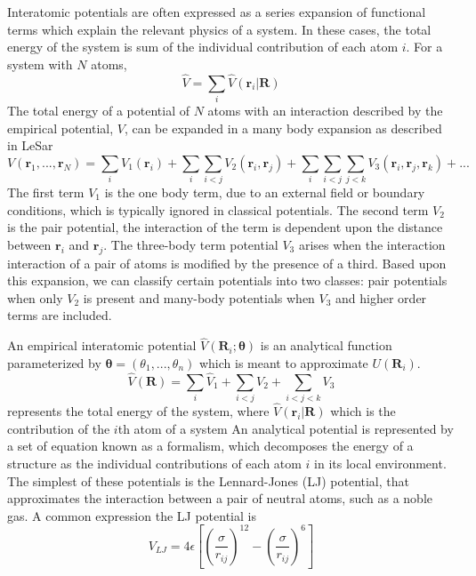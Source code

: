 Interatomic potentials are often expressed as a series expansion of functional terms which explain the relevant physics of a system.  In these cases, the total energy of the system is sum of the individual contribution of each atom $i$.  For a system with $N$ atoms,
\begin{equation}
	\hat{V}= \sum_{i} \hat{V}(\bm{r}_i\vert\bm{R})
\end{equation}
The total energy of a potential of $N$ atoms with an interaction described by the empirical potential, $V$, can be expanded in a many body expansion as described in LeSar\cite{lesar2013_textbook}
\begin{equation}
	V(\bm{r}_1,...,\bm{r}_N)= \sum_i V_1(\bm{r}_i)
	        + \sum_i \sum_{i<j} V_2(\bm{r}_i,\bm{r}_j)
				  + \sum_i \sum_{i<j} \sum_{j<k} V_3(\bm{r}_i,\bm{r}_j,\bm{r}_k) + ...
\end{equation}
The first term $V_1$ is the one body term, due to an external field or boundary conditions, which is typically ignored in classical potentials.  
The second term $V_2$ is the pair potential, the interaction of the term is dependent upon the distance between $\bm{r}_i$ and $\bm{r}_j$.  
The three-body term potential $V_3$ arises when the interaction interaction of a pair of atoms is modified by the presence of a third.  
Based upon this expansion, we can classify certain potentials into two classes: pair potentials when only $V_2$ is present and many-body potentials when $V_3$ and higher order terms are included.

An empirical interatomic potential $\hat{V}(\bm{R}_i;\bm{\theta})$ is an analytical function parameterized by $\bm{\theta}=(\theta_1,...,\theta_n)$ which is meant to approximate $U(\bm{R}_i)$.  
\begin{equation}
	\hat{V}(\bm{R})=\sum_i \hat{V}_1 + \sum_{i<j} V_2 + \sum_{i<j<k} V_3
\end{equation}
represents the total energy of the system, where $\hat{V}(\bm{r}_i \vert \bm{R})$ which is the contribution of the $i$th atom of  a system
An analytical potential is represented by a set of equation known as a formalism, which decomposes the energy of a structure as the individual contributions of each atom $i$ in its local environment.
The simplest of these potentials is the Lennard-Jones (LJ) potential\cite{lennardjones1924_lj_pot}, that approximates the interaction between a pair of neutral atoms, such as a noble gas.
A common expression the LJ potential is 
\begin{equation}
  V_{LJ} = 4 \epsilon 
    \left[ 
	\left(\frac{\sigma}{r_{ij}}\right)^{12}
	- \left(\frac{\sigma}{r_{ij}}\right)^{6}
    \right]
\end{equation}


